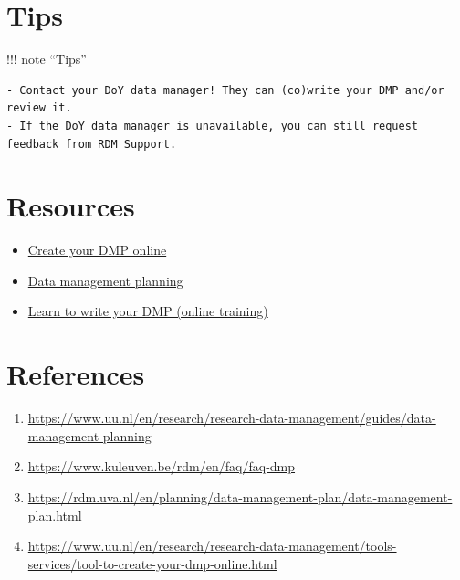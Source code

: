 \documentclass[
  letterpaper,
  DIV=11,
  numbers=noendperiod]{scrreprt}
\providecommand{\tightlist}{%
  \setlength{\itemsep}{0pt}\setlength{\parskip}{0pt}}\usepackage{longtable,booktabs,array}
\begin{document}
\section*{Tips}\label{tips}


!!! note ``Tips''

\begin{verbatim}
- Contact your DoY data manager! They can (co)write your DMP and/or review it.
- If the DoY data manager is unavailable, you can still request feedback from RDM Support.
\end{verbatim}

\section*{Resources}\label{resources}


\begin{itemize}
\tightlist
\item
  \href{https://www.uu.nl/en/research/research-data-management/tools-services/tool-to-create-your-dmp-online}{Create
  your DMP online}
\item
  \href{https://www.uu.nl/en/research/research-data-management/guides/data-management-planning}{Data
  management planning}
\item
  \href{https://www.uu.nl/en/research/research-data-management/training-workshops/online-training-learn-to-write-your-dmp}{Learn
  to write your DMP (online training)}
\end{itemize}

\section*{References}\label{references}


\begin{enumerate}
\def\labelenumi{\arabic{enumi}.}
\item
  \url{https://www.uu.nl/en/research/research-data-management/guides/data-management-planning}
\item
  \url{https://www.kuleuven.be/rdm/en/faq/faq-dmp}
\item
  \url{https://rdm.uva.nl/en/planning/data-management-plan/data-management-plan.html}
\item
  \url{https://www.uu.nl/en/research/research-data-management/tools-services/tool-to-create-your-dmp-online.html}
\end{enumerate}
\end{document}
